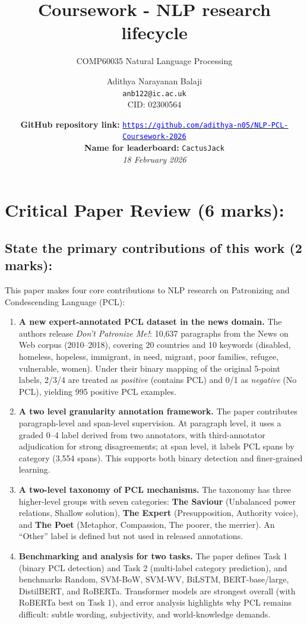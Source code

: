 \documentclass[11pt, a4paper]{article}
\title{Coursework - NLP research lifecycle}
\author{
    Adithya Narayanan Balaji\\
    \texttt{anb122@ic.ac.uk}\\
    \small{CID: 02300564} \\
}
\subtitle{COMP60035 Natural Language Processing}
\date{
    \vspace{10mm}
    \textbf{GitHub repository link:} \href{https://github.com/adithya-n05/NLP-PCL-Coursework-2026}{\textcolor{blue}{\texttt{https://github.com/adithya-n05/NLP-PCL-Coursework-2026}}}\\
    \textbf{Name for leaderboard:} \texttt{CactusJack}\\
    \textit{18 February 2026}
}
\makeatletter
\renewcommand\tableofcontents{%
    \newpage
\section*{\contentsname
        \@mkboth{
           \MakeUppercase\contentsname}{}}
    \@starttoc{toc}%
    }
\makeatother
\begin{document}
\begin{titlepage}
  \maketitle
  \thispagestyle{empty}
\end{titlepage}
\setcounter{page}{1}
\newpage
\clearpage
\tableofcontents
\setcounter{page}{1}
\newpage
\section{Critical Paper Review (6 marks):}
\subsection{State the primary contributions of this work (2 marks):}
This paper makes four core contributions to NLP research on Patronizing and Condescending Language (PCL):

\begin{enumerate}
  \item \textbf{A new expert-annotated PCL dataset in the news domain.} The authors release \textit{Don't Patronize Me!}: 10,637 paragraphs from the News on Web corpus (2010--2018), covering 20 countries and 10 keywords (disabled, homeless, hopeless, immigrant, in need, migrant, poor families, refugee, vulnerable, women). Under their binary mapping of the original 5-point labels, 2/3/4 are treated as \textit{positive} (contains PCL) and 0/1 as \textit{negative} (No PCL), yielding 995 positive PCL examples.

  \item \textbf{A two level granularity annotation framework.} The paper contributes paragraph-level and span-level supervision. At paragraph level, it uses a graded 0--4 label derived from two annotators, with third-annotator adjudication for strong disagreements; at span level, it labels PCL spans by category (3,554 spans). This supports both binary detection and finer-grained learning.

  \item \textbf{A two-level taxonomy of PCL mechanisms.} The taxonomy has three higher-level groups with seven categories: \textbf{The Saviour} (Unbalanced power relations, Shallow solution), \textbf{The Expert} (Presupposition, Authority voice), and \textbf{The Poet} (Metaphor, Compassion, The poorer, the merrier). An ``Other'' label is defined but not used in released annotations.

  \item \textbf{Benchmarking and analysis for two tasks.} The paper defines Task 1 (binary PCL detection) and Task 2 (multi-label category prediction), and benchmarks Random, SVM-BoW, SVM-WV, BiLSTM, BERT-base/large, DistilBERT, and RoBERTa. Transformer models are strongest overall (with RoBERTa best on Task 1), and error analysis highlights why PCL remains difficult: subtle wording, subjectivity, and world-knowledge demands.
\end{enumerate}
\end{document}
